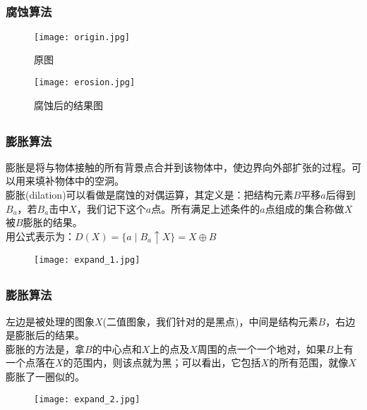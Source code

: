 \documentclass[notheorems,mathserif,table,compress]{beamer}  %
\begin{document}
\subsection{}
\begin{frame}
   \frametitle{腐蚀算法}
   \begin{figure}
   \centering
   \texttt{[image: origin.jpg]}
   \caption{原图}
   \end{figure}
   \begin{figure}
   \centering
   \texttt{[image: erosion.jpg]}
   \caption{腐蚀后的结果图}
   \end{figure}
\end{frame}


\subsection{}
\begin{frame}
   \frametitle{膨胀算法}
   \hspace{0.3in}膨胀是将与物体接触的所有背景点合并到该物体中，使边界向外部扩张的过程。可以用来填补物体中的空洞。\\
   \hspace{0.3in}膨胀(dilation)可以看做是腐蚀的对偶运算，其定义是：把结构元素$B$平移$a$后得到$B_{a}$，若$B_{a}$击中$X$，我们记下这个$a$点。所有满足上述条件的$a$点组成的集合称做$X$被$B$膨胀的结果。\\
   用公式表示为：$D(X)=\{a\mid B_{a}\uparrow X\}=X\oplus B$
   \begin{figure}
   \centering
   \texttt{[image: expand\_1.jpg]}
   \end{figure}
\end{frame}

\subsection{}
\begin{frame}
   \frametitle{膨胀算法}
  \hspace{0.3in}左边是被处理的图象$X$(二值图象，我们针对的是黑点)，中间是结构元素$B$，右边是膨胀后的结果。\\
  \hspace{0.3in}膨胀的方法是，拿$B$的中心点和$X$上的点及$X$周围的点一个一个地对，如果$B$上有一个点落在$X$的范围内，则该点就为黑；可以看出，它包括$X$的所有范围，就像$X$膨胀了一圈似的。
   \begin{figure}
   \centering
   \texttt{[image: expand\_2.jpg]}
   \end{figure}
\end{frame}
\end{document}
